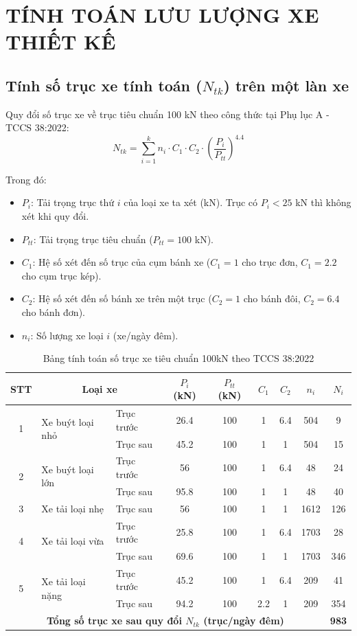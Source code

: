 \section{TÍNH TOÁN LƯU LƯỢNG XE THIẾT KẾ}

\subsection{Tính số trục xe tính toán (\texorpdfstring{$N_{tk}$}{Ntk}) trên một làn xe}
Quy đổi số trục xe về trục tiêu chuẩn 100 kN theo công thức tại Phụ lục A - TCCS 38:2022:
$$ N_{tk} = \sum_{i=1}^{k} n_i \cdot C_1 \cdot C_2 \cdot \left( \frac{P_i}{P_{tt}} \right)^{4.4} $$

Trong đó:
\begin{itemize}
    \item $P_i$: Tải trọng trục thứ $i$ của loại xe ta xét (kN). Trục có $P_i < 25$ kN thì không xét khi quy đổi.
    \item $P_{tt}$: Tải trọng trục tiêu chuẩn ($P_{tt} = 100$ kN).
    \item $C_1$: Hệ số xét đến số trục của cụm bánh xe ($C_1 = 1$ cho trục đơn, $C_1 = 2.2$ cho cụm trục kép).
    \item $C_2$: Hệ số xét đến số bánh xe trên một trục ($C_2 = 1$ cho bánh đôi, $C_2 = 6.4$ cho bánh đơn).
    \item $n_i$: Số lượng xe loại $i$ (xe/ngày đêm).
\end{itemize}

\begin{table}[H]
\centering
\caption{Bảng tính toán số trục xe tiêu chuẩn 100kN theo TCCS 38:2022}
\begin{tabular}{|c|l|l|c|c|c|c|c|c|}
\hline
\textbf{STT} & \multicolumn{2}{c|}{\textbf{Loại xe}} & \textbf{$P_i$ (kN)} & \textbf{$P_{tt}$ (kN)} & \textbf{$C_1$} & \textbf{$C_2$} & \textbf{$n_i$} & \textbf{$N_i$} \\
\hline
\multirow{2}{*}{1} & \multirow{2}{*}{Xe buýt loại nhỏ} & Trục trước & 26.4 & 100 & 1 & 6.4 & 504 & 9 \\
 & & Trục sau & 45.2 & 100 & 1 & 1 & 504 & 15 \\
\hline
\multirow{2}{*}{2} & \multirow{2}{*}{Xe buýt loại lớn} & Trục trước & 56 & 100 & 1 & 6.4 & 48 & 24 \\
 & & Trục sau & 95.8 & 100 & 1 & 1 & 48 & 40 \\
\hline
3 & Xe tải loại nhẹ & Trục sau & 56 & 100 & 1 & 1 & 1612 & 126 \\
\hline
\multirow{2}{*}{4} & \multirow{2}{*}{Xe tải loại vừa} & Trục trước & 25.8 & 100 & 1 & 6.4 & 1703 & 28 \\
 & & Trục sau & 69.6 & 100 & 1 & 1 & 1703 & 346 \\
\hline
\multirow{2}{*}{5} & \multirow{2}{*}{Xe tải loại nặng} & Trục trước & 45.2 & 100 & 1 & 6.4 & 209 & 41 \\
 & & Trục sau & 94.2 & 100 & 2.2 & 1 & 209 & 354 \\
\hline
\multicolumn{8}{|c|}{\textbf{Tổng số trục xe sau quy đổi $N_{tk}$ (trục/ngày đêm)}} & \textbf{983} \\
\hline
\end{tabular}
\end{table}

